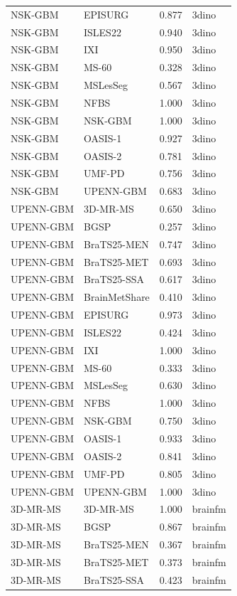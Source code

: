 \begin{tabular}{llrl}
NSK-GBM & EPISURG & 0.877 & 3dino \\
NSK-GBM & ISLES22 & 0.940 & 3dino \\
NSK-GBM & IXI & 0.950 & 3dino \\
NSK-GBM & MS-60 & 0.328 & 3dino \\
NSK-GBM & MSLesSeg & 0.567 & 3dino \\
NSK-GBM & NFBS & 1.000 & 3dino \\
NSK-GBM & NSK-GBM & 1.000 & 3dino \\
NSK-GBM & OASIS-1 & 0.927 & 3dino \\
NSK-GBM & OASIS-2 & 0.781 & 3dino \\
NSK-GBM & UMF-PD & 0.756 & 3dino \\
NSK-GBM & UPENN-GBM & 0.683 & 3dino \\
UPENN-GBM & 3D-MR-MS & 0.650 & 3dino \\
UPENN-GBM & BGSP & 0.257 & 3dino \\
UPENN-GBM & BraTS25-MEN & 0.747 & 3dino \\
UPENN-GBM & BraTS25-MET & 0.693 & 3dino \\
UPENN-GBM & BraTS25-SSA & 0.617 & 3dino \\
UPENN-GBM & BrainMetShare & 0.410 & 3dino \\
UPENN-GBM & EPISURG & 0.973 & 3dino \\
UPENN-GBM & ISLES22 & 0.424 & 3dino \\
UPENN-GBM & IXI & 1.000 & 3dino \\
UPENN-GBM & MS-60 & 0.333 & 3dino \\
UPENN-GBM & MSLesSeg & 0.630 & 3dino \\
UPENN-GBM & NFBS & 1.000 & 3dino \\
UPENN-GBM & NSK-GBM & 0.750 & 3dino \\
UPENN-GBM & OASIS-1 & 0.933 & 3dino \\
UPENN-GBM & OASIS-2 & 0.841 & 3dino \\
UPENN-GBM & UMF-PD & 0.805 & 3dino \\
UPENN-GBM & UPENN-GBM & 1.000 & 3dino \\
3D-MR-MS & 3D-MR-MS & 1.000 & brainfm \\
3D-MR-MS & BGSP & 0.867 & brainfm \\
3D-MR-MS & BraTS25-MEN & 0.367 & brainfm \\
3D-MR-MS & BraTS25-MET & 0.373 & brainfm \\
3D-MR-MS & BraTS25-SSA & 0.423 & brainfm \\

\end{tabular}
